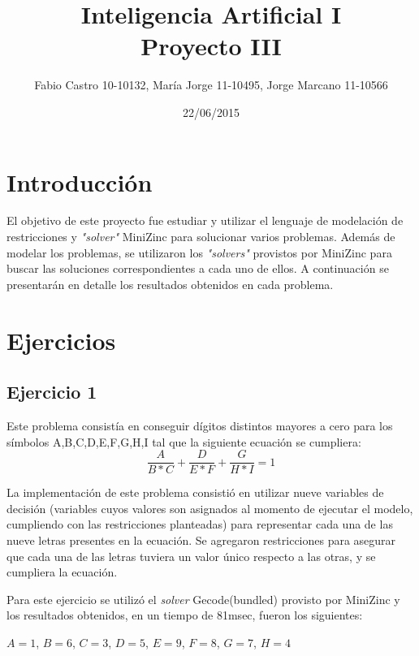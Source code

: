 \documentclass{article}
\title{}
\author{}
\date{}
\begin{document}
 
\title{\Huge Inteligencia Artificial I\\ Proyecto III}



\author{Fabio Castro 10-10132, María Jorge 11-10495, Jorge Marcano 11-10566} 



\date{22/06/2015}

\maketitle

\section{Introducción}
\hspace{0.5cm}
El objetivo de este proyecto fue estudiar y utilizar el lenguaje de modelación de restricciones y \textit{"solver"} MiniZinc para solucionar varios problemas. Además de modelar los problemas, se utilizaron los \textit{"solvers"} provistos por MiniZinc para buscar las soluciones correspondientes a cada uno de ellos. A continuación se presentarán en detalle los resultados obtenidos en cada problema.


\section{Ejercicios}
\hspace{0.5cm}
\subsection{Ejercicio 1}

Este problema consistía en conseguir dígitos distintos mayores a cero para los símbolos {A,B,C,D,E,F,G,H,I} tal que la siguiente ecuación se cumpliera:
\begin{equation}
\frac{A}{B*C} + \frac{D}{E*F} + \frac{G}{H*I} = 1
\end{equation}

La implementación de este problema consistió en utilizar nueve variables de decisión (variables cuyos valores son asignados al momento de ejecutar el modelo, cumpliendo con las restricciones planteadas) para representar cada una de las nueve letras presentes en la ecuación. Se agregaron restricciones para asegurar que cada una de las letras tuviera un valor único respecto a las otras, y se cumpliera la ecuación.

Para este ejercicio se utilizó el \textit{solver} Gecode(bundled) provisto por MiniZinc y los resultados obtenidos, en un tiempo de 81msec, fueron los siguientes:\\
\begin{center} $A = 1$, $B = 6$, $C = 3$, $D = 5$, $E = 9$, $F = 8$, $G = 7$, $H = 4$ \end{center}
\end{document}

